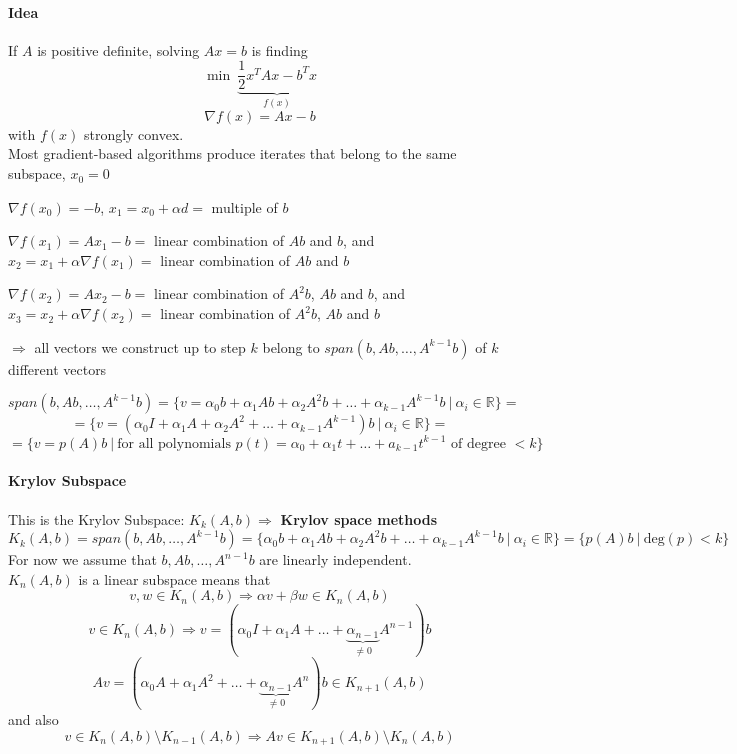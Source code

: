 \documentclass[10pt]{report}
\begin{document}
\paragraph{Idea} If $A$ is positive definite, solving $Ax=b$ is finding $$\min\:\underset{f(x)}{\underbrace{\frac{1}{2}x^TAx - b^Tx}}$$ $$\nabla f(x) = Ax-b$$ with $f(x)$ strongly convex. \\
Most gradient-based algorithms produce iterates that belong to the same subspace, $x_0 = 0$\begin{list}{}{}
	\item $\nabla f(x_0) = -b$, $x_1 = x_0+\alpha d=$ multiple of $b$
	\item $\nabla f(x_1) = Ax_1-b=$ linear combination of $Ab$ and $b$, and $x_2=x_1+\alpha\nabla f(x_1) =$ linear combination of $Ab$ and $b$
	\item $\nabla f(x_2) = Ax_2-b=$ linear combination of $A^2b$, $Ab$ and $b$, and $x_3=x_2+\alpha\nabla f(x_2) =$ linear combination of $A^2b$, $Ab$ and $b$
	\item[$\Rightarrow$] all vectors we construct up to step $k$ belong to $span(b,Ab,\ldots,A^{k-1}b)$ of $k$ different vectors
\end{list}
$$span(b,Ab,\ldots,A^{k-1}b) = \{v=\alpha_0b+\alpha_1Ab+\alpha_2A^2b+\ldots+\alpha_{k-1}A^{k-1}b\:|\:\alpha_i\in \mathbb{R}\}=$$
$$=\{v = (\alpha_0I+\alpha_1A+\alpha_2A^2+\ldots+\alpha_{k-1}A^{k-1})b\:|\:\alpha_i\in \mathbb{R}\} = $$
$$ = \{v=p(A)b\:|\:\text{for all polynomials }p(t)=\alpha_0+\alpha_1t+\ldots+a_{k-1}t^{k-1}\text{ of degree }<k\}$$

\paragraph{Krylov Subspace} This is the Krylov Subspace: $K_k(A,b)\Rightarrow$ \textbf{Krylov space methods}
$$K_k(A,b) = span(b,Ab,\ldots,A^{k-1}b) = \{\alpha_0b+\alpha_1Ab+\alpha_2A^2b+\ldots+\alpha_{k-1}A^{k-1}b\:|\:\alpha_i\in \mathbb{R}\} = \{p(A)b\:|\:\text{deg}(p)<k\}$$
For now we assume that $b, Ab, \ldots, A^{n-1}b$ are linearly independent.\\
$K_n(A,b)$ is a linear subspace means that $$v,w\in K_n(A,b)\Rightarrow \alpha v+\beta w\in K_n(A,b)$$
$$v\in K_n(A,b)\Rightarrow v=(\alpha_0 I + \alpha_1 A + \ldots + \underset{\neq 0}{\underbrace{\alpha_{n-1}}} A^{n-1})b$$ $$Av = (\alpha_0A + \alpha_1 A^2+\ldots + \underset{\neq 0}{\underbrace{\alpha_{n-1}}} A^n)b \in K_{n+1}(A,b)$$ and also $$v\in K_n(A,b) \setminus K_{n-1}(A,b)\Rightarrow Av \in K_{n+1}(A,b)\setminus K_n(A,b)$$
\pagebreak
\end{document}
